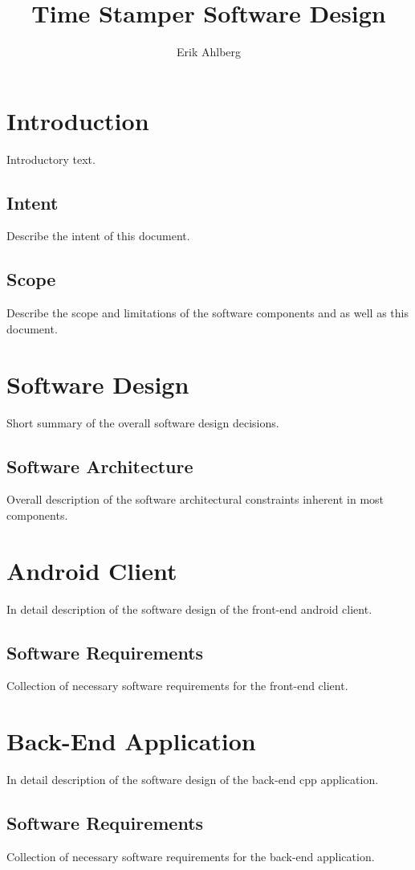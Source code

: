 \documentclass{report}
\begin{document}
\title{Time Stamper Software Design}
\author{Erik Ahlberg}

\maketitle

\tableofcontents

\newpage

\chapter{Introduction}
Introductory text.

\section{Intent}
Describe the intent of this document.

\section{Scope}
Describe the scope and limitations of the software components and as well as this document.

\chapter{Software Design}
Short summary of the overall software design decisions.

\section{Software Architecture}
Overall description of the software architectural constraints inherent in most components.

\chapter{Android Client}
In detail description of the software design of the front-end android client.

\section{Software Requirements}
Collection of necessary software requirements for the front-end client.

\chapter{Back-End Application}
In detail description of the software design of the back-end cpp application.

\section{Software Requirements}
Collection of necessary software requirements for the back-end application.
\end{document}
